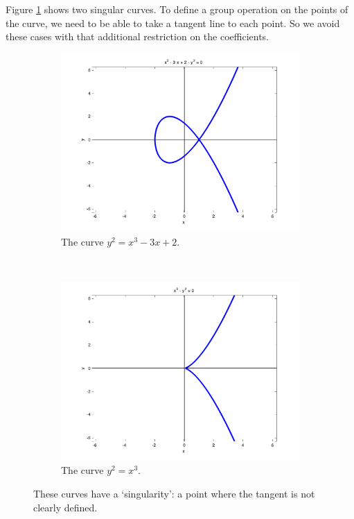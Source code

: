 \documentclass{article}
\begin{document}
Figure \ref{fig:ec-singular} shows two singular curves.
To define a group operation on the points of the curve, we need to be able to take a tangent line to each point.
So we avoid these cases with that additional restriction on the coefficients.

\begin{figure}[h]
\centering

\begin{subfigure}{.5\textwidth}
	\centering
	\includegraphics[width=1\linewidth]{images/ec2.png}
	\caption{The curve $y^2 = x^3 - 3x + 2$.}
\end{subfigure}%
~%
\begin{subfigure}{.5\textwidth}
	\centering
	\includegraphics[width=1\linewidth]{images/ec3.png}
	\caption{The curve $y^2 = x^3$.}
\end{subfigure}

\caption{These curves have a `singularity': a point where the tangent is not clearly defined.}
\label{fig:ec-singular}
\end{figure}
\end{document}
